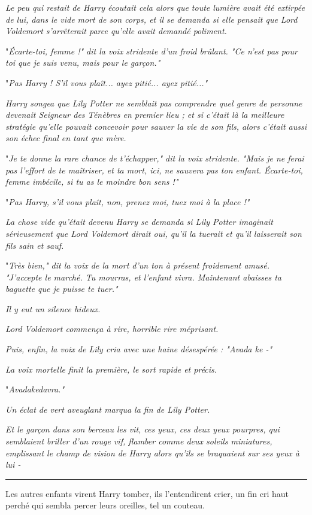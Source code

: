 \emph{Le peu qui restait de Harry écoutait cela alors que toute lumière avait été extirpée de lui, dans le vide mort de son corps, et il se demanda si elle pensait que Lord Voldemort s'arrêterait parce qu'elle avait demandé poliment.} 

"\emph{Écarte-toi, femme !" dit la voix stridente d'un froid brûlant. "Ce n'est pas pour toi que je suis venu, mais pour le garçon."} 

"\emph{Pas Harry ! S'il vous plaît... ayez pitié... ayez pitié..."} 

\emph{Harry songea que Lily Potter ne semblait pas comprendre quel genre de personne devenait Seigneur des Ténèbres en premier lieu ; et si c'était là la meilleure stratégie qu'elle pouvait concevoir pour sauver la vie de son fils, alors c'était aussi son échec final en tant que mère.} 

"\emph{Je te donne la rare chance de t'échapper," dit la voix stridente. "Mais je ne ferai pas l'effort de te maîtriser, et ta mort, ici, ne sauvera pas ton enfant. Écarte-toi, femme imbécile, si tu as le moindre bon sens !"} 

"\emph{Pas Harry, s'il vous plaît, non, prenez moi, tuez moi à la place !"} 

\emph{La chose vide qu'était devenu Harry se demanda si Lily Potter imaginait sérieusement que Lord Voldemort dirait oui, qu'il la tuerait et qu'il laisserait son fils sain et sauf.} 

"\emph{Très bien," dit la voix de la mort d'un ton à présent froidement amusé. "J'accepte le marché. Tu mourras, et l'enfant vivra. Maintenant abaisses ta baguette que je puisse te tuer."} 

\emph{Il y eut un silence hideux.} 

\emph{Lord Voldemort commença à rire, horrible rire méprisant.} 

\emph{Puis, enfin, la voix de Lily cria avec une haine désespérée : "Avada ke -"} 

\emph{La voix mortelle finit la première, le sort rapide et précis.} 

"\emph{Avadakedavra."} 

\emph{Un éclat de vert aveuglant marqua la fin de Lily Potter.} 

\emph{Et le garçon dans son berceau les vit, ces yeux, ces deux yeux pourpres, qui semblaient briller d'un rouge vif, flamber comme deux soleils miniatures, emplissant le champ de vision de Harry alors qu'ils se braquaient sur ses yeux à lui -} 
\par\noindent\rule{\textwidth}{0.4pt}
Les autres enfants virent Harry tomber, ils l'entendirent crier, un fin cri haut perché qui sembla percer leurs oreilles, tel un couteau.

